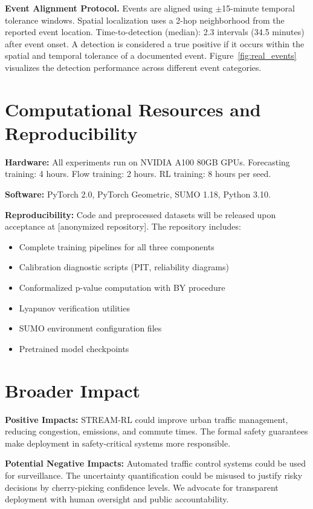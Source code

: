 \documentclass{article}
\theoremstyle{plain}
\theoremstyle{definition}
\theoremstyle{remark}
\begin{document}
\textbf{Event Alignment Protocol.} Events are aligned using $\pm$15-minute temporal tolerance windows. Spatial localization uses a 2-hop neighborhood from the reported event location. Time-to-detection (median): 2.3 intervals (34.5 minutes) after event onset. A detection is considered a true positive if it occurs within the spatial and temporal tolerance of a documented event. Figure~\ref{fig:real_events} visualizes the detection performance across different event categories.
\section{Computational Resources and Reproducibility}
\label{app:compute}

\textbf{Hardware:} All experiments run on NVIDIA A100 80GB GPUs. Forecasting training: 4 hours. Flow training: 2 hours. RL training: 8 hours per seed.

\textbf{Software:} PyTorch 2.0, PyTorch Geometric, SUMO 1.18, Python 3.10.

\textbf{Reproducibility:} Code and preprocessed datasets will be released upon acceptance at [anonymized repository]. The repository includes:
\begin{itemize}
    \item Complete training pipelines for all three components
    \item Calibration diagnostic scripts (PIT, reliability diagrams)
    \item Conformalized p-value computation with BY procedure
    \item Lyapunov verification utilities
    \item SUMO environment configuration files
    \item Pretrained model checkpoints
\end{itemize}

\section{Broader Impact}
\label{app:impact}

\textbf{Positive Impacts:} STREAM-RL could improve urban traffic management, reducing congestion, emissions, and commute times. The formal safety guarantees make deployment in safety-critical systems more responsible.

\textbf{Potential Negative Impacts:} Automated traffic control systems could be used for surveillance. The uncertainty quantification could be misused to justify risky decisions by cherry-picking confidence levels. We advocate for transparent deployment with human oversight and public accountability.
\end{document}
